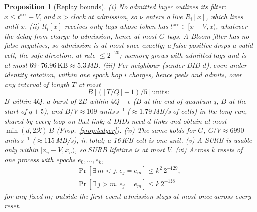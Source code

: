\documentclass[journal]{IEEEtran}
\newtheorem{proposition}{Proposition}
\newcommand{\arr}{t^{\mathrm{arr}}}
\begin{document}
\begin{proposition}[Replay bounds]\label{prop:replay}
(i) No admitted layer outlives its filter: $x\le\arr+V$, and
$x>\mathit{clock}$ at admission, so $\nu$ enters a live $R_i[x]$, which
lives until $x$.  (ii) $R_i[x]$ receives only tags whose token has
$\arr\in[x-V,x)$, whatever the delay from charge to admission, hence at
most $G$ tags.  A Bloom filter has no false negatives, so admission
is at most once exactly; a false positive drops a valid cell, the safe
direction, at rate $\le2^{-20}$; memory grows with admitted tags and is at
most $69\cdot76.96\,\mathrm{KB}\approx5.3$\,MB.
(iii) Per neighbour (sender DID $d$), even under identity rotation,
within one epoch hop $i$ charges, hence peels and admits, over any interval of length $T$
at most
\[
B\,\bigl\lceil(\lceil T/Q\rceil+1)/5\bigr\rceil\ \text{units}:
\]
$B$ within $4Q$, a burst of $2B$ within $4Q+\epsilon$ ($B$ at the end of
quantum $q$, $B$ at the start of $q+5$), and $B/V\approx109$
units\,s$^{-1}$ ($\approx1.79$\,MB/s of cells) in the long run, shared by
every loop on that link; $d$ DIDs need $d$ links and obtain at most
$\min(d,2\mathcal R)\,B$ (Prop.~\ref{prop:ledger}).
(iv) The same holds for $G$, $G/V\approx6990$ units\,s$^{-1}$
($\approx115$\,MB/s), in total; a 16\,KiB cell is one unit.  (v) A SURB is usable
only within $[x_\upsilon-V,x_\upsilon)$, so SURB lifetime is at most $V$.
(vi) Across $k$ resets of one process with epochs $e_0,\dots,e_k$,
\begin{gather*}
\Pr[\exists\,m<j.\ e_j=e_m]\le k^2\,2^{-129},\\
\Pr[\exists\,j>m.\ e_j=e_m]\le k\,2^{-128}
\end{gather*}
for any fixed $m$; outside the first event admission stays at most once
across every reset.
\end{proposition}
\end{document}
